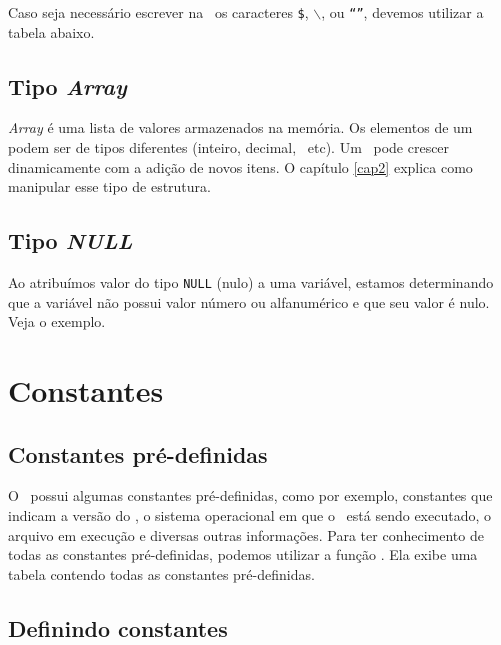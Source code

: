 

Caso seja necessário escrever na \tipostring~os caracteres \texttt{\$}, 
\texttt{$\backslash$}, \texttt{\textquotesingle} ou \texttt{{``''}}, devemos utilizar a tabela abaixo. 

% 

\subsection{Tipo \textit{Array}}
\label{tipo-array}

\textit{Array} é uma lista de valores armazenados na memória. Os elementos de um \tipoarray~
podem ser de tipos diferentes (inteiro, decimal, \tipostring~etc). Um \tipoarray~pode crescer
dinamicamente com a adição de novos itens. O capítulo \ref{cap2} explica como
manipular esse tipo de estrutura.

\subsection{Tipo \textit{NULL}}
\label{tipo-null}

Ao atribuímos valor do tipo \texttt{NULL} (nulo) a uma variável, estamos determinando
que a variável não possui valor número ou alfanumérico e que seu valor é nulo. Veja o exemplo.



\section{Constantes}
\label{constantes}

\subsection{Constantes pré-definidas}
\label{constantes-pre-definidas}

O \php~possui algumas constantes pré-definidas, como por exemplo, constantes que indicam a versão
do \php, o sistema operacional em que o \php~está sendo executado, o arquivo em execução
e diversas outras informações. Para ter conhecimento de todas as constantes pré-definidas,
podemos utilizar a função \funcaophpinfo. Ela exibe uma tabela contendo todas as constantes
pré-definidas.

\subsection{Definindo constantes}
\label{definindo-constantes}

